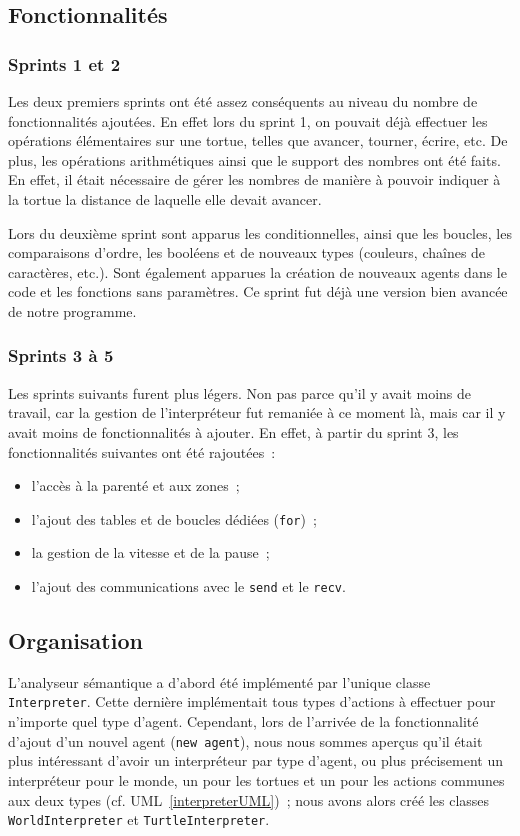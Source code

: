 \subsection{Fonctionnalités}

\subsubsection{Sprints 1 et 2}
Les deux premiers sprints ont été assez conséquents au niveau du nombre de fonctionnalités ajoutées.
En effet lors du sprint 1, on pouvait déjà effectuer les opérations élémentaires sur une tortue, telles que avancer, tourner, écrire, etc. De plus, les opérations arithmétiques ainsi que le support des nombres ont été faits. En effet, il était nécessaire de gérer les nombres de manière à pouvoir indiquer à la tortue la distance de laquelle elle devait avancer.

Lors du deuxième sprint sont apparus les conditionnelles, ainsi que les boucles, les comparaisons d'ordre, les booléens et de nouveaux types (couleurs, chaînes de caractères, etc.). Sont également apparues la création de nouveaux agents dans le code et les fonctions sans paramètres. Ce sprint fut déjà une version bien avancée de notre programme.

\subsubsection{Sprints 3 à 5}
Les sprints suivants furent plus légers. Non pas parce qu'il y avait moins de travail, car la gestion de l'interpréteur fut remaniée à ce moment là, mais car il y avait moins de fonctionnalités à ajouter. En effet, à partir du sprint 3, les fonctionnalités suivantes ont été rajoutées~:
\begin{itemize}
\item l'accès à la parenté et aux zones~;
\item l'ajout des tables et de boucles dédiées (\verb|for|)~;
\item la gestion de la vitesse et de la pause~;
\item l'ajout des communications avec le \verb|send| et le \verb|recv|.
\end{itemize}

\subsection{Organisation}

L'analyseur sémantique a d'abord été implémenté par l'unique classe \verb|Interpreter|.
Cette dernière implémentait tous types d'actions à effectuer pour n'importe quel type d'agent.
Cependant, lors de l'arrivée de la fonctionnalité d'ajout d'un nouvel agent (\verb|new agent|), nous nous sommes aperçus qu'il était plus intéressant d'avoir un interpréteur par type d'agent, ou plus précisement un interpréteur pour le monde, un pour les tortues et un pour les actions communes aux deux types (cf. UML~\ref{interpreterUML})~; nous avons alors créé les classes \verb|WorldInterpreter| et \verb|TurtleInterpreter|.

